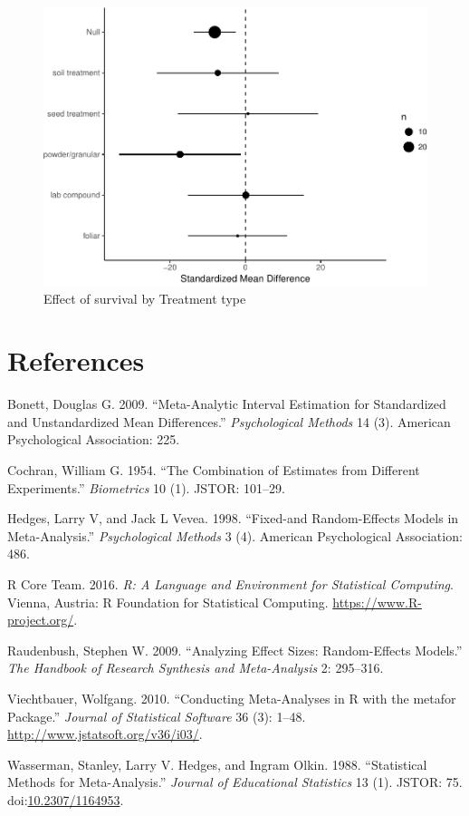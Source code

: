 \documentclass[]{elsarticle} %
\makeatletter
\def\maxwidth{\ifdim\Gin@nat@width>\linewidth\linewidth
\else\Gin@nat@width\fi}
\let\Oldincludegraphics\includegraphics
\renewcommand{\includegraphics}[1]{\Oldincludegraphics[width=\maxwidth]{#1}}
\makeatother
\begin{document}
\begin{figure}[htbp]
\centering
\includegraphics{MetanalysisNeonics_files/figure-latex/unnamed-chunk-25-1.pdf}
\caption{Effect of survival by Treatment type}
\end{figure}

\section*{References}\label{references}

Bonett, Douglas G. 2009. ``Meta-Analytic Interval Estimation for
Standardized and Unstandardized Mean Differences.'' \emph{Psychological
Methods} 14 (3). American Psychological Association: 225.

Cochran, William G. 1954. ``The Combination of Estimates from Different
Experiments.'' \emph{Biometrics} 10 (1). JSTOR: 101--29.

Hedges, Larry V, and Jack L Vevea. 1998. ``Fixed-and Random-Effects
Models in Meta-Analysis.'' \emph{Psychological Methods} 3 (4). American
Psychological Association: 486.

R Core Team. 2016. \emph{R: A Language and Environment for Statistical
Computing}. Vienna, Austria: R Foundation for Statistical Computing.
\url{https://www.R-project.org/}.

Raudenbush, Stephen W. 2009. ``Analyzing Effect Sizes: Random-Effects
Models.'' \emph{The Handbook of Research Synthesis and Meta-Analysis} 2:
295--316.

Viechtbauer, Wolfgang. 2010. ``Conducting Meta-Analyses in R with the
metafor Package.'' \emph{Journal of Statistical Software} 36 (3): 1--48.
\url{http://www.jstatsoft.org/v36/i03/}.

Wasserman, Stanley, Larry V. Hedges, and Ingram Olkin. 1988.
``Statistical Methods for Meta-Analysis.'' \emph{Journal of Educational
Statistics} 13 (1). JSTOR: 75.
doi:\href{http://dx.doi.org/10.2307/1164953}{10.2307/1164953}.
\end{document}
